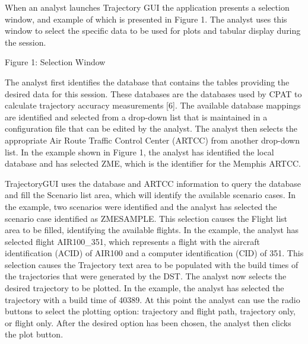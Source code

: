 \documentclass[]{article}
\begin{document}
When an analyst launches Trajectory GUI the application presents a selection window, and example of which is presented in Figure 1. The analyst uses this window to select the specific data to be used for plots and tabular display during the session.

Figure 1: Selection Window

The analyst first identifies the database that contains the tables providing the desired data for this session. These databases are the databases used by CPAT to calculate trajectory accuracy measurements [6]. The available database mappings are identified and selected from a drop-down list that is maintained in a configuration file that can be edited by the analyst. The analyst then selects the appropriate Air Route Traffic Control Center (ARTCC) from another drop-down list. In the example shown in Figure 1, the analyst has identified the local database and has selected ZME, which is the identifier for the Memphis ARTCC.

TrajectoryGUI uses the database and ARTCC information to query the database and fill the Scenario list area, which will identify the available scenario cases. In the example, two scenarios were identified and the analyst has selected the scenario case identified as ZMESAMPLE. This selection causes the Flight list area to be filled, identifying the available flights. In the example, the analyst has selected flight AIR100\_351, which represents a flight with the aircraft identification (ACID) of AIR100 and a computer identification (CID) of 351. This selection causes the Trajectory text area to be populated with the build times of the trajectories that were generated by the DST. The analyst now selects the desired trajectory to be plotted. In the example, the analyst has selected the trajectory with a build time of 40389. At this point the analyst can use the radio buttons to select the plotting option: trajectory and flight path, trajectory only, or flight only. After the desired option has been chosen, the analyst then clicks the plot button.
\end{document}
